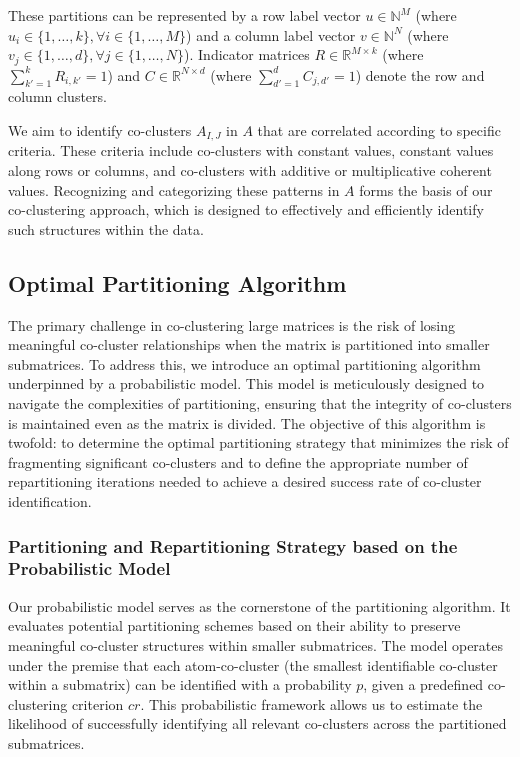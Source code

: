 These partitions can be represented by a row label vector $u \in \mathbb{N}^M$ (where $u_i \in \{1, \ldots, k\}, \forall i \in \{1, \ldots, M\}$) and a column label vector $v \in \mathbb{N}^N$ (where $v_j \in \{1, \ldots, d\}, \forall j \in \{1, \ldots, N\}$). Indicator matrices $R \in \mathbb{R}^{M \times k}$ (where $\sum_{k'=1}^{k} R_{i,k'} = 1$) and $C \in \mathbb{R}^{N \times d}$ (where $\sum_{d'=1}^{d} C_{j,d'} = 1$) denote the row and column clusters. 

We aim to identify co-clusters $A_{I,J}$ in $A$ that are correlated according to specific criteria. These criteria include co-clusters with constant values, constant values along rows or columns, and co-clusters with additive or multiplicative coherent values. Recognizing and categorizing these patterns in $A$ forms the basis of our co-clustering approach, which is designed to effectively and efficiently identify such structures within the data.

\subsection{Optimal Partitioning Algorithm}
The primary challenge in co-clustering large matrices is the risk of losing meaningful co-cluster relationships when the matrix is partitioned into smaller submatrices. To address this, we introduce an optimal partitioning algorithm underpinned by a probabilistic model. This model is meticulously designed to navigate the complexities of partitioning, ensuring that the integrity of co-clusters is maintained even as the matrix is divided. The objective of this algorithm is twofold: to determine the optimal partitioning strategy that minimizes the risk of fragmenting significant co-clusters and to define the appropriate number of repartitioning iterations needed to achieve a desired success rate of co-cluster identification.

\subsubsection{Partitioning and Repartitioning Strategy based on the Probabilistic Model}
Our probabilistic model serves as the cornerstone of the partitioning algorithm. It evaluates potential partitioning schemes based on their ability to preserve meaningful co-cluster structures within smaller submatrices. The model operates under the premise that each atom-co-cluster (the smallest identifiable co-cluster within a submatrix) can be identified with a probability $p$, given a predefined co-clustering criterion $cr$. This probabilistic framework allows us to estimate the likelihood of successfully identifying all relevant co-clusters across the partitioned submatrices.


